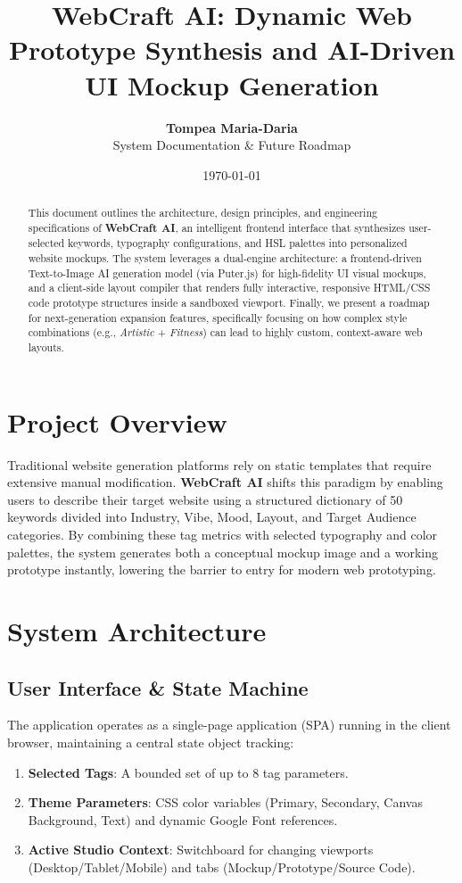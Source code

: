 \documentclass[11pt,a4paper]{article}
\title{\textbf{WebCraft AI: Dynamic Web Prototype Synthesis and AI-Driven UI Mockup Generation}}
\author{\textbf{Tompea Maria-Daria} \\ System Documentation \& Future Roadmap}
\date{\today}
\begin{document}
\maketitle

\begin{abstract}
This document outlines the architecture, design principles, and engineering specifications of \textbf{WebCraft AI}, an intelligent frontend interface that synthesizes user-selected keywords, typography configurations, and HSL palettes into personalized website mockups. The system leverages a dual-engine architecture: a frontend-driven Text-to-Image AI generation model (via Puter.js) for high-fidelity UI visual mockups, and a client-side layout compiler that renders fully interactive, responsive HTML/CSS code prototype structures inside a sandboxed viewport. Finally, we present a roadmap for next-generation expansion features, specifically focusing on how complex style combinations (e.g., \textit{Artistic} + \textit{Fitness}) can lead to highly custom, context-aware web layouts.
\end{abstract}

\tableofcontents

\newpage

\section{Project Overview}
Traditional website generation platforms rely on static templates that require extensive manual modification. \textbf{WebCraft AI} shifts this paradigm by enabling users to describe their target website using a structured dictionary of 50 keywords divided into Industry, Vibe, Mood, Layout, and Target Audience categories. By combining these tag metrics with selected typography and color palettes, the system generates both a conceptual mockup image and a working prototype instantly, lowering the barrier to entry for modern web prototyping.

\section{System Architecture}

\subsection{User Interface \& State Machine}
The application operates as a single-page application (SPA) running in the client browser, maintaining a central state object tracking:
\begin{enumerate}
    \item \textbf{Selected Tags}: A bounded set of up to 8 tag parameters.
    \item \textbf{Theme Parameters}: CSS color variables (Primary, Secondary, Canvas Background, Text) and dynamic Google Font references.
    \item \textbf{Active Studio Context}: Switchboard for changing viewports (Desktop/Tablet/Mobile) and tabs (Mockup/Prototype/Source Code).
\end{enumerate}
\end{document}
